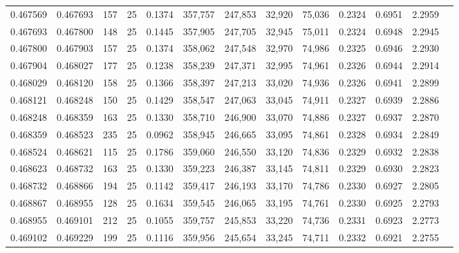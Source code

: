 \begin{tabular}{rrrrrrrrrrrrr}
0.467569 & 0.467693 &   157 &  25 &                                     0.1374 & 357,757 & 247,853 &  32,920 &  75,036 & 0.2324 & 0.6951 & 2.2959 \\
0.467693 & 0.467800 &   148 &  25 &                                     0.1445 & 357,905 & 247,705 &  32,945 &  75,011 & 0.2324 & 0.6948 & 2.2945 \\
0.467800 & 0.467903 &   157 &  25 &                                     0.1374 & 358,062 & 247,548 &  32,970 &  74,986 & 0.2325 & 0.6946 & 2.2930 \\
0.467904 & 0.468027 &   177 &  25 &                                     0.1238 & 358,239 & 247,371 &  32,995 &  74,961 & 0.2326 & 0.6944 & 2.2914 \\
0.468029 & 0.468120 &   158 &  25 &                                     0.1366 & 358,397 & 247,213 &  33,020 &  74,936 & 0.2326 & 0.6941 & 2.2899 \\
0.468121 & 0.468248 &   150 &  25 &                                     0.1429 & 358,547 & 247,063 &  33,045 &  74,911 & 0.2327 & 0.6939 & 2.2886 \\
0.468248 & 0.468359 &   163 &  25 &                                     0.1330 & 358,710 & 246,900 &  33,070 &  74,886 & 0.2327 & 0.6937 & 2.2870 \\
0.468359 & 0.468523 &   235 &  25 &                                     0.0962 & 358,945 & 246,665 &  33,095 &  74,861 & 0.2328 & 0.6934 & 2.2849 \\
0.468524 & 0.468621 &   115 &  25 &                                     0.1786 & 359,060 & 246,550 &  33,120 &  74,836 & 0.2329 & 0.6932 & 2.2838 \\
0.468623 & 0.468732 &   163 &  25 &                                     0.1330 & 359,223 & 246,387 &  33,145 &  74,811 & 0.2329 & 0.6930 & 2.2823 \\
0.468732 & 0.468866 &   194 &  25 &                                     0.1142 & 359,417 & 246,193 &  33,170 &  74,786 & 0.2330 & 0.6927 & 2.2805 \\
0.468867 & 0.468955 &   128 &  25 &                                     0.1634 & 359,545 & 246,065 &  33,195 &  74,761 & 0.2330 & 0.6925 & 2.2793 \\
0.468955 & 0.469101 &   212 &  25 &                                     0.1055 & 359,757 & 245,853 &  33,220 &  74,736 & 0.2331 & 0.6923 & 2.2773 \\
0.469102 & 0.469229 &   199 &  25 &                                     0.1116 & 359,956 & 245,654 &  33,245 &  74,711 & 0.2332 & 0.6921 & 2.2755 \\

\end{tabular}
